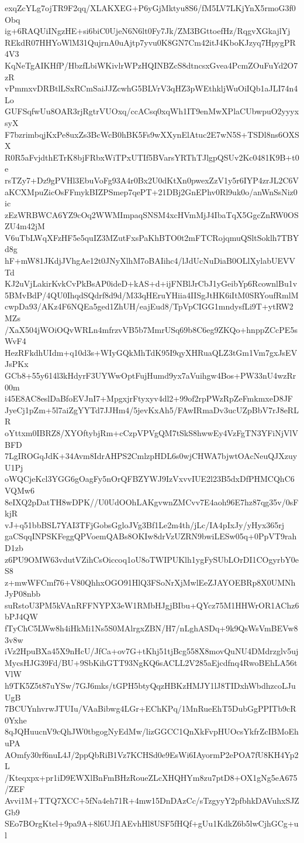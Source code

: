 exqZcYLg7ojTR9F2qq/XLAKXEG+P6yGjMktyu8S6/fM5LV7LKjYnX5rmoG3f0Obq
ig+6RAQUiINgzHE+si6biC0UjeN6N6lt0Fy7Jk/ZM3BGttoefHz/RqgvXGkajlYj
REkdR07HHYoWlM31QujrnA0uAjtp7yvu0K8GN7Cm42itJ4KboKJzyq7HpygPR4V3
KqNeTgAIKHfP/HbzfLbiWKivlrWPzHQINBZcS8dtncsxGvea4PcmZOuFuYd2O7zR
vPmmxvDRBtlLSxRCmSaiJJZcwhG5BLVrV3qHZ3pWEthkljWuOiIQb1aJLI74n4Lo
GUFSqfwUu8OAR3rjRgtrVUOxq/ccACsq0xqWh1IT9enMwXPlaCUbwpuO2yyyxsyX
F7bzrimbqjKxPe8uxZs3BcWcB0hBK5Fs9wXXynElAtuc2E7wN5S+TSDl8ns6OXSX
R0R5aFvjdthETrK8bjFRbxWiTPxUTIf5BVarsYRThTJlgpQSUv2Kc0481K9B+t0e
rsTZy7+Dz9gPVHl3EbuVoFg93A4r0Bx2U0dKtXn0pwexZzV1y5r6IYP4zrJL2C6V
aKCXMpuZicOsFFmykBIZPSmep7qePT+21DBj2GnEPhv0Rl9uk0o/anWnSsNiz0ic
zEzWRBWCA6YZ9cOq2WWMImpaqSNSM4xcHVmMjJ4IbaTqX5GgcZnRW0OSZU4m42jM
V6uTbLWqXFzHF5e5quIZ3MZutFxsPaKhBTO0t2mFTCRojqmuQSltSoklh7TBYd8g
hF+mW81JKdjJVhgAe12t0JNyXlhM7oBAIihc4/lJdUcNuDiaB0OLlXylabUEVVTd
KJ2uVjLakirKvkCvPkBsAP0ideD+kAS+d+ijFNBlJrCbJ1yGeibYp6RcownlBu1v
5BMvBdP/4QU0IhqdSQdrf8d9d/M33qHEruYHiia4IISgJtHK6iItM0SRYoufRmlM
cwpDa93/AKz4F6NQEa5ged1ZhUH/eajEud8/TpVpCIGG1mndysfLi9T+ytRW2MZs
/XaX504jWOiOQvWRLn4mfrzvVB5b7MmrUSq69b8C6eg9ZKQo+hnppZCcPE5sWvF4
HezRFkdhUIdm+q10d3s+WIyGQkMhTdK95I9qyXHRuaQLZ3tGm1Vm7gxJsEVJsPKx
GCb8+55y614l3kHdyrF3UYWwOptFujHumd9yx7aVuihgw4Bos+PW33nU4wzRr00m
i45E8AC8eslDaBfoEVJnI7+MpgxjrFtyxyv4dl2+99of2rpPWzRpZeFmkmxeD8JF
JyeCj1pZm+5l7aiZgYYTd7JJHm4/5jevKxAh5/FAwIRmaDv3ucUZpBbV7rJ8eRLR
oYttxm0IBRZ8/XYOftybjRm+cCzpVPVgQM7tSkS8hwwEy4VzFgTN3YFiNjVlVBFD
7LgIROGqJdK+34Avm8IdrAHPS2CmlzpHDL6s0wjCHWA7bjwtOAcNeuQJXzuyU1Pj
oWQCjeKcl3YGG6gOagFy5nOrQFBZYWJ9IzVxvvIUE2l23B5dxDfPHMCQhC6VQMw6
8eIXQ2pDatTH8wDPK//U0UdOOhLAKgvwnZMCvv7E4aoh96E7hz87qg35v/0sFkjR
vJ+q51bbBSL7YAI3TFjGobsGgloJVg3Bf1Le2m4th/jLc/IA4pIxJy/yHyx365rj
gaCSqqINPSKFeggQPVoemQABs8OKIw8drVzUZRN9bwiLESw05q+0PpVT9rahD1zb
z6PU9OMW63vdutVZihCsOiccoq1oU8oTWIPUKlh1ygFySUbLOrDI1COgyrbY0eS8
z+mwWFCmf76+V80QhhxOGO91HlQ3FSoNrXjMwlEeZJAYOEBRp8X0UMNhJyP08nbb
suRstoU3PM5kVAnRFFNYPX3eW1RMbHJgjBIbu+QYcz75M1HHWrOR1AChz6bPJ4QW
fTyChC5LWw8h4iHkMi1Ns5S0MAlrgxZBN/H7/nLghASDq+9k9QsWsVmBEVw83v8w
iVz2HpuBXa45X9nHcU/JfCa+ov7G+tKhj51tjBcg558X8movQuNU4DMdrzglv5uj
MycsHJG39Fd/BU+9SbKihGTT93NgKQ6sACLL2V285aEjcdfnq4RwoBEhLA56tVlW
h9TK5Z5t87uYSw/7GJ6mks/tGPH5btyQqzHBKzHMJY1lJ8TIDxhWbdhzcoLJuUgB
7BCUYnhvrwJTUIu/VAaBibwg4LGr+EChKPq/1MnRueEhT5DubGgPPITb9cR0Yxhe
8qJQHuucnV9cQhJW0tbgogNyEdMw/lizGGCC1QnXkFvpHUOcsYkfrZcIBMoEhuPA
AOmfy30rf6nuL4J/2ppQbRiB1Vz7KCHSd0e9EsWi6IAyormP2ePOA7fU8KH4Yp2L
/Kteqxpx+pr1iD9EWXlBnFmBHzRoueZLcXHQHYm8zu7ptD8+OX1gNg5eA675/ZEF
Avvi1M+TTQ7XCC+5fNa4eh71R+4mw15DnDAzCc/sTzgyyY2pfbhkDAVuhxSJZGb9
SEo7BOrgKtel+9pa9A+8l6UJf1AEvhHl8USF5fHQf+gUu1KdkZ6b5lwCjhGCg+ul
